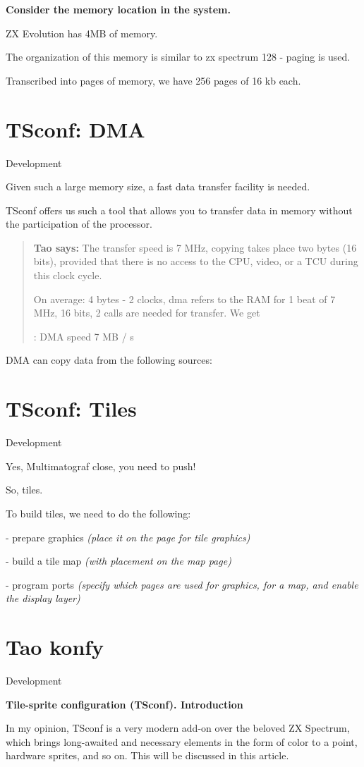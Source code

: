 \documentclass{article}
\begin{document}
\textbf{Consider the memory location in the system. }

ZX Evolution has 4MB of memory.

The organization of this memory is similar to zx spectrum 128 -
paging is used.

Transcribed into pages of memory, we have 256 pages of 16 kb each.
\section*{TSconf: DMA}
Development

Given such a large memory size, a fast data transfer facility is
needed.

TSconf offers us such a tool that allows you to transfer data in
memory without the participation of the processor.

\begin{quotation}
  \textbf{Tao says:} The transfer speed is 7 MHz, copying takes place
  two bytes (16 bits), provided that there is no access to the CPU,
  video, or a TCU during this clock cycle.

  On average: 4 bytes - 2 clocks, dma refers to the RAM for 1 beat
  of 7 MHz, 16 bits, 2 calls are needed for transfer. We get

  : DMA speed 7 MB / s
\end{quotation}
DMA can copy data from the following sources:
\section*{TSconf: Tiles}
Development

Yes, Multimatograf close, you need to push!

So, tiles.

To build tiles, we need to do the following:

- prepare graphics \emph{(place it on the page for tile graphics)}

- build a tile map \emph{(with placement on the map page)}

- program ports \emph{(specify which pages are used for graphics, for
  a map, and enable the display layer) }
\section*{Tao konfy}

Development

\textbf{Tile-sprite configuration (TSconf). Introduction}

In my opinion, TSconf is a very modern add-on over the beloved ZX
Spectrum, which brings long-awaited and necessary elements in the
form of color to a point, hardware sprites, and so on. This will be
discussed in this article.
\end{document}
